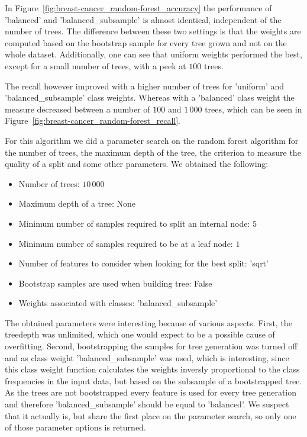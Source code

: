 \documentclass[a4paper,11pt]{article}
\begin{document}
        In Figure~\ref{fig:breast-cancer_random-forest_accuracy} the performance of 'balanced' and 'balanced\_subsample' is almost identical, independent of the number of trees. The difference between these two settings is that the weights are computed based on the bootstrap sample for every tree grown and not on the whole dataset. Additionally, one can see that uniform weights performed the best, except for a small number of trees, with a peek at $100$ trees. 
        
        The recall however improved with a higher number of trees for 'uniform' and 'balanced\_subsample' class weights. Whereas with a 'balanced' class weight the measure decreased between a number of $100$ and $1\,000$ trees, which can be seen in Figure~\ref{fig:breast-cancer_random-forest_recall}.
        
        For this algorithm we did a parameter search on the random forest algorithm for the number of trees, the maximum depth of the tree, the criterion to measure the quality of a split and some other parameters. We obtained the following: 
        \begin{itemize}
            \item Number of trees: $10\,000$
            \item Maximum depth of a tree: None
            \item Minimum number of samples required to split an internal node: $5$
            \item Minimum number of samples required to be at a leaf node: $1$
            \item Number of features to consider when looking for the best split: 'sqrt'
            \item Bootstrap samples are used when building tree: False
            \item Weights associated with classes: 'balanced\_subsample'
        \end{itemize}
        
        The obtained parameters were interesting because of various aspects. First, the treedepth was unlimited, which one would expect to be a possible cause of overfitting. Second, bootstrapping the samples for tree generation was turned off and as class weight 'balanced\_subsample' was used, which is interesting, since this class weight function calculates the weights inversly proportional to the class frequencies in the input data, but based on the subsample of a bootstrapped tree. As the trees are not bootstrapped every feature is used for every tree generation and therefore 'balanced\_subsample' should be equal to 'balanced'. We suspect that it actually is, but share the first place on the parameter search, so only one of those parameter options is returned.
\end{document}
